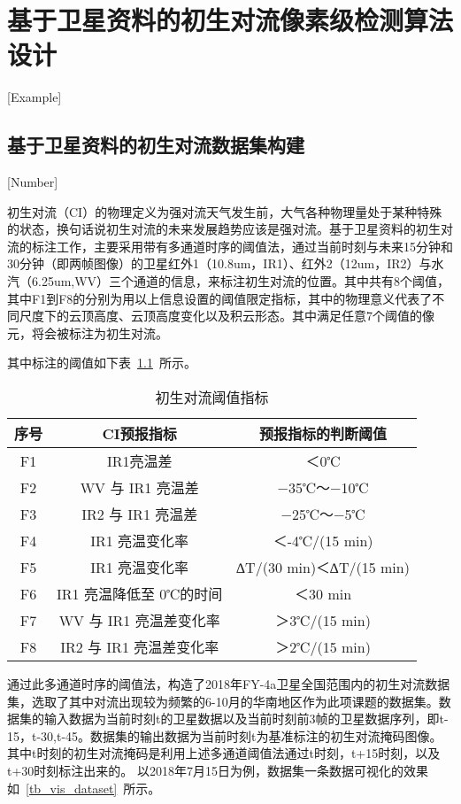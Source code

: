 
\chapter{基于卫星资料的初生对流像素级检测算法设计}[Example]


\section{基于卫星资料的初生对流数据集构建}[Number]

初生对流（CI）的物理定义为强对流天气发生前，大气各种物理量处于某种特殊的状态，换句话说初生对流的未来发展趋势应该是强对流。基于卫星资料的初生对流的标注工作，主要采用带有多通道时序的阈值法，通过当前时刻与未来15分钟和30分钟（即两帧图像）的卫星红外1（10.8um，IR1）、红外2（12um，IR2）与水汽（6.25um,WV）三个通道的信息，来标注初生对流的位置。其中共有8个阈值，其中F1到F8的分别为用以上信息设置的阈值限定指标，其中的物理意义代表了不同尺度下的云顶高度、云顶高度变化以及积云形态。其中满足任意7个阈值的像元，将会被标注为初生对流。

其中标注的阈值如下表~\ref{tb_threshold}~所示。

\begin{table}[h]
	\centering
	\label{tb_threshold}
	\caption{初生对流阈值指标}
	\begin{tabular}{c c c}
		\hline 序号 & CI预报指标 & 预报指标的判断阈值 \\
		\hline F1 & IR1亮温差 &	＜0℃ \\
		 F2 &WV 与 IR1 亮温差 &	−35℃～−10℃ \\
		 F3 &IR2 与 IR1 亮温差 &	−25℃～−5℃\\
		 F4 &IR1 亮温变化率 &	＜-4℃/(15 min) \\
		 F5 & IR1 亮温变化率&	∆T/(30 min)＜∆T/(15 min) \\
		 F6 & IR1 亮温降低至 0℃的时间 &	＜30 min \\
	 	 F7 &WV 与 IR1 亮温差变化率 &＞3℃/(15 min) \\
		 F8 & IR2 与 IR1 亮温差变化率 &＞2℃/(15 min) \\
		\hline 
	\end{tabular}
\end{table}

通过此多通道时序的阈值法，构造了2018年FY-4a卫星全国范围内的初生对流数据集，选取了其中对流出现较为频繁的6-10月的华南地区作为此项课题的数据集。数据集的输入数据为当前时刻t的卫星数据以及当前时刻前3帧的卫星数据序列，即t-15，t-30,t-45。数据集的输出数据为当前时刻t为基准标注的初生对流掩码图像。其中t时刻的初生对流掩码是利用上述多通道阈值法通过t时刻，t+15时刻，以及t+30时刻标注出来的。
以2018年7月15日为例，数据集一条数据可视化的效果如~\ref{tb_vis_dataset}~所示。


